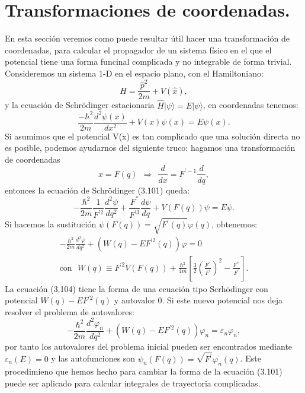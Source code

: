 \section{Transformaciones de coordenadas.}
En esta sección veremos como puede resultar útil hacer una transformación de coordenadas, para calcular el propagador de un sistema físico en el que el potencial tiene una forma funcinal complicada y no integrable de forma trivial. Consideremos un sistema 1-D en el espacio plano, con el Hamiltoniano:
\begin{equation}
\hat{H}=\frac{\hat{p}^{2}}{2m}+V(\hat{x}),
\end{equation} 
y la ecuación de Schrödinger estacionaria $\hat{H}|\psi\rangle=E|\psi\rangle $, en coordenadas tenemos:
\begin{equation}
\frac{-\hbar^{2}}{2m}\frac{d^{2}\psi(x)}{dx^{2}}+V(x)\psi(x)=E\psi(x).
\end{equation}
Si asumimos que el potencial V(x) es tan complicado que una solución directa no es posible, podemos ayudarnos del siguiente truco: hagamos una transformación de coordenadas
\begin{equation}
x=F(q)\ \ \Rightarrow\ \ \frac{d}{dx}=F^{\prime-1}\frac{d}{dq},
\end{equation}
entonces la ecuación de Schrödinger (3.101) queda:
\begin{equation}
-\frac{\hbar^{2}}{2m}\frac{1}{F^{'2}}\frac{d^{2}\psi}{dq^{2}}+\frac{F^{''}}{F^{'3}}\frac{d\psi}{dq}+V(F(q))\psi=E\psi .
\end{equation}
Si hacemos la sustitución $\psi (F(q))=\sqrt{F^{'}(q)}\varphi(q)$, obtenemos:
\begin{eqnarray}
&-\frac{\hbar^{2}}{2m}\frac{d^{2}\varphi}{dq^{2}}+\left(W(q)-EF^{'2}(q)\right)\varphi=0&\\
\nonumber &\text{con}\ \ \ W(q)\equiv F^{'2}V(F(q))+\frac{\hbar^{2}}{4m}\left[\frac{3}{2}\left(\frac{F^{''}}{F^{'}}\right)^{2}-\frac{F^{'''}}{F^{'}}\right] . &
\end{eqnarray}
La ecuación (3.104) tiene la forma de una ecuación tipo Scrhödinger con potencial $W(q)-EF^{'2}(q)$ y autovalor $0$. Si este nuevo potencial nos deja resolver el problema de autovalores:
\begin{equation}
-\frac{\hbar^{2}}{2m}\frac{d^{2}\varphi_{n}}{dq^{2}}+\left(W(q)-EF^{'2}(q)\right)\varphi_{n}=\varepsilon_{n}\varphi_{n},
\end{equation}
por tanto los autovalores del problema inicial pueden ser encontrados mediante $\varepsilon_{n}(E)=0$ y las autofunciones son $\psi_n(F(q))=\sqrt{F^{'}}\varphi_n(q)$. Este procedimieno que hemos hecho para cambiar la forma de la ecuación (3.101) puede ser aplicado para calcular integrales de trayectoria complicadas.

